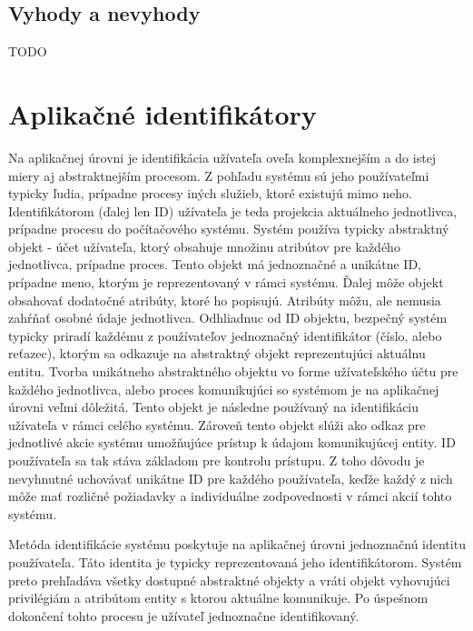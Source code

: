 \documentclass[
  printed, %
  table,   %
  lof,     %
  lot,     %
]{fithesis3}
\begin{document}

\subsection{Vyhody a nevyhody}
TODO

\section{Aplikačné identifikátory}
Na aplikačnej úrovni je identifikácia užívateľa oveľa komplexnejším a do istej
miery aj abstraktnejším procesom. Z pohľadu systému sú jeho používateľmi
typicky ľudia, prípadne procesy iných služieb, ktoré existujú mimo neho.
Identifikátorom (ďalej len ID) užívateľa je teda projekcia aktuálneho
jednotlivca, prípadne procesu do počítačového systému. Systém používa typicky
abstraktný objekt - účet užívateľa, ktorý obsahuje množinu atribútov pre
každého jednotlivca, prípadne proces. Tento objekt má jednoznačné a unikátne
ID, prípadne meno, ktorým je reprezentovaný v rámci systému. Ďalej môže objekt
obsahovať dodatočné atribúty, ktoré ho popisujú. Atribúty môžu, ale nemusia
zahŕňať osobné údaje jednotlivca. Odhliadnuc od ID objektu, bezpečný systém
typicky priradí každému z používateľov jednoznačný identifikátor (číslo, alebo
reťazec), ktorým sa odkazuje na abstraktný objekt reprezentujúci aktuálnu
entitu. Tvorba unikátneho abstraktného objektu vo forme užívateľského účtu
pre každého jednotlivca, alebo proces komunikujúci so systémom je na aplikačnej
úrovni veľmi dôležitá. Tento objekt je následne používaný na identifikáciu
užívateľa v rámci celého systému. Zároveň tento objekt slúži ako odkaz pre
jednotlivé akcie systému umožňujúce prístup k údajom komunikujúcej entity.
ID používateľa sa tak stáva základom pre kontrolu prístupu. Z toho dôvodu je 
nevyhnutné uchovávať unikátne ID pre každého používateľa, keďže každý z nich
môže mať rozličné požiadavky a individuálne zodpovednosti v rámci akcií tohto
systému.

Metóda identifikácie systému poskytuje na aplikačnej úrovni jednoznačnú
identitu používateľa. Táto identita je typicky reprezentovaná jeho
identifikátorom. Systém preto prehľadáva všetky dostupné abstraktné objekty a
vráti objekt vyhovujúci privilégiám a atribútom entity s ktorou aktuálne
komunikuje. Po úspešnom dokončení tohto procesu je užívateľ jednoznačne
identifikovaný.
\end{document}
